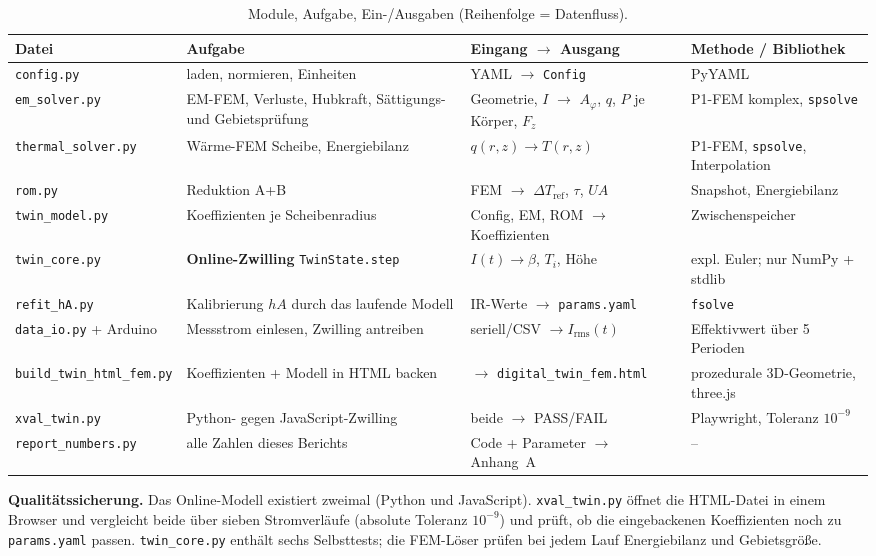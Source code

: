 \documentclass[a4paper, 10pt, conference]{ieeeconf}
\theoremstyle{remark}
\begin{document}
\begin{table}[t]
\centering\footnotesize
\caption{Module, Aufgabe, Ein-/Ausgaben (Reihenfolge = Datenfluss).}
\label{tab:modules}
\begin{tabularx}{\textwidth}{@{}l X X X@{}}
\toprule
Datei & Aufgabe & Eingang $\to$ Ausgang & Methode / Bibliothek \\
\midrule
\texttt{config.py} & laden, normieren, Einheiten & YAML $\to$ \texttt{Config} & PyYAML \\
\texttt{em\_solver.py} & EM-FEM, Verluste, Hubkraft, Sättigungs- und Gebietsprüfung & Geometrie, $I$ $\to$ $A_\varphi$, $q$, $P$ je Körper, $F_z$ & P1-FEM komplex, \texttt{spsolve} \\
\texttt{thermal\_solver.py} & Wärme-FEM Scheibe, Energiebilanz & $q(r,z)\to T(r,z)$ & P1-FEM, \texttt{spsolve}, Interpolation \\
\texttt{rom.py} & Reduktion A+B & FEM $\to$ $\Delta T_{\mathrm{ref}}$, $\tau$, $UA$ & Snapshot, Energiebilanz \\
\texttt{twin\_model.py} & Koeffizienten je Scheibenradius & Config, EM, ROM $\to$ Koeffizienten & Zwischenspeicher \\
\texttt{twin\_core.py} & \textbf{Online-Zwilling} \texttt{TwinState.step} & $I(t)\to\beta$, $T_i$, Höhe & expl. Euler; nur NumPy + stdlib \\
\texttt{refit\_hA.py} & Kalibrierung $hA$ durch das laufende Modell & IR-Werte $\to$ \texttt{params.yaml} & \texttt{fsolve} \\
\texttt{data\_io.py} + Arduino & Messstrom einlesen, Zwilling antreiben & seriell/CSV $\to I_{\mathrm{rms}}(t)$ & Effektivwert über 5 Perioden \\
\texttt{build\_twin\_html\_fem.py} & Koeffizienten + Modell in HTML backen & $\to$ \texttt{digital\_twin\_fem.html} & prozedurale 3D-Geometrie, three.js \\
\texttt{xval\_twin.py} & Python- gegen JavaScript-Zwilling & beide $\to$ PASS/FAIL & Playwright, Toleranz $10^{-9}$ \\
\texttt{report\_numbers.py} & alle Zahlen dieses Berichts & Code + Parameter $\to$ Anhang~A & -- \\
\bottomrule
\end{tabularx}
\end{table}

\textbf{Qualitätssicherung.} Das Online-Modell existiert zweimal (Python
und JavaScript). \texttt{xval\_twin.py} öffnet die HTML-Datei in einem
Browser und vergleicht beide über sieben Stromverläufe (absolute Toleranz
$10^{-9}$) und prüft, ob die eingebackenen Koeffizienten noch zu
\texttt{params.yaml} passen. \texttt{twin\_core.py} enthält sechs
Selbsttests; die FEM-Löser prüfen bei jedem Lauf Energiebilanz und
Gebietsgröße.
\end{document}
